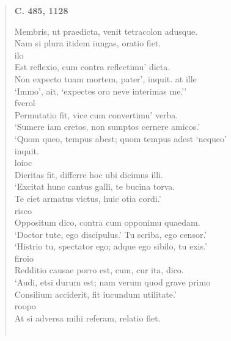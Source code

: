 \documentclass[11pt, a4paper]{report}
\begin{document}
\begin{verse}
     \marginpar{[10]} \begin{center} \textbf{C. 485, 1128} \end{center}Membris, ut praedicta, venit tetracolon adusque. \\ Nam si plura itidem iungas, oratio fiet. \\ ilo \\ Est reflexio, cum contra reflectimu’ dicta. \\ Non expecto tuam mortem, pater’, inquit. at ille \\ ‘Immo’, ait, ‘expectes oro neve interimas me.’’ \\ fverol \\ Permutatio fit, vice cum convertimu’ verba. \\ ‘Sumere iam cretos, non sumptos cernere amicos.’ \\ ‘Quom queo, tempus abest; \lbrack quom tempus adest \rbrack ‘nequeo’ \\ inquit. \\ loioc \\ Dieritas fit, differre hoc ubi dicimus illi. \\ ‘Excitat hunc cantus galli, te bucina torva. \\ Te ciet armatus victus, huic otia cordi.’ \\ risco \\ Oppositum dico, contra cum opponimu quaedam. \\ ‘Doctor tute, ego discipulus.’ Tu scriba, ego censor.’ \\ ‘Histrio tu, spectator ego; adque ego sibilo, tu exis.’ \\ firoio \\ Redditio causae porro est, cum, cur ita, dico. \\ ‘Audi, etsi durum est; nam verum quod grave primo \\ Consilium acciderit, fit iucundum utilitate.’ \\ roopo \\ At si adversa mihi referam, relatio fiet. \\ 
        ﻿\pagebreak 

\end{verse}
\end{document}
